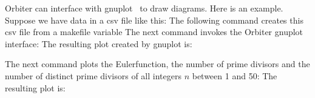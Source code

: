 Orbiter can interface with gnuplot~\cite{gnuplot} to draw diagrams.
Here is an example. Suppose we have data in a csv file like this:
The following command creates this csv file from a makefile variable
The next command invokes the Orbiter gnuplot interface:
The resulting plot created by gnuplot is:

The next command plots the Eulerfunction, 
the number of prime divisors and the number 
of distinct prime divisors of all integers $n$ between 1 and 50:
The resulting plot is:
